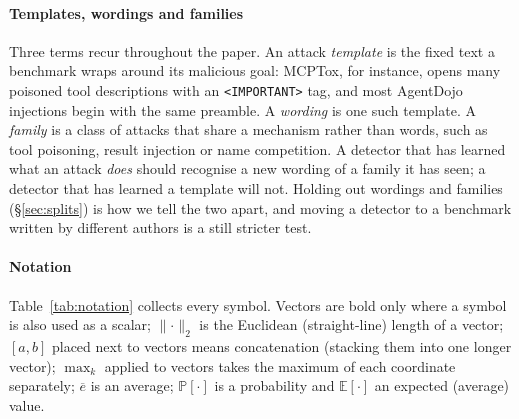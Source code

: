 \documentclass[conference,compsoc]{IEEEtran}
\newcommand{\E}{\mathbb{E}}
\newcommand{\Prob}{\mathbb{P}}
\begin{document}
\paragraph{Templates, wordings and families} Three terms recur throughout the paper. An attack \emph{template} is the fixed text a benchmark wraps around its malicious goal: MCPTox, for instance, opens many poisoned tool descriptions with an \texttt{<IMPORTANT>} tag, and most AgentDojo injections begin with the same preamble. A \emph{wording} is one such template. A \emph{family} is a class of attacks that share a mechanism rather than words, such as tool poisoning, result injection or name competition. A detector that has learned what an attack \emph{does} should recognise a new wording of a family it has seen; a detector that has learned a template will not. Holding out wordings and families (\S\ref{sec:splits}) is how we tell the two apart, and moving a detector to a benchmark written by different authors is a still stricter test.

\paragraph{Notation} Table~\ref{tab:notation} collects every symbol. Vectors are bold only where a symbol is also used as a scalar; $\lVert\cdot\rVert_{2}$ is the Euclidean (straight-line) length of a vector; $[a,b]$ placed next to vectors means concatenation (stacking them into one longer vector); $\max_{k}$ applied to vectors takes the maximum of each coordinate separately; $\overline{e}$ is an average; $\Prob[\cdot]$ is a probability and $\E[\cdot]$ an expected (average) value.
\end{document}
